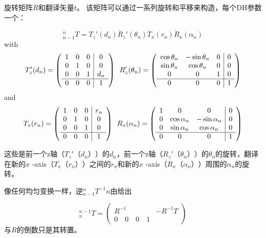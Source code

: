 旋转矩阵$ R $和翻译矢量$ t $。 该矩阵可以通过一系列旋转和平移来构造，每个DH参数一个：

\begin{equation}
_{n-1}^nT=T_z'(d_n)\dot R_z'(\theta_n) \dot T_x(r_n) \dot R_x(\alpha_n)
\end{equation}
with
\begin{equation}
T_z'(d_n)=
\left(
\begin{array}{ccc|c}
1 & 0 & 0 & 0\\
0 & 1 & 0 & 0\\
0 & 0 & 1 & d_n\\
\hline
0 & 0 & 0 & 1
\end{array}
\right)
\enskip
R_z'(\theta_n)=\left(
\begin{array}{ccc|c}
\cos\theta_n & -\sin\theta_n & 0 & 0\\
\sin\theta_n & \cos\theta_n & 0 & 0\\
0 & 0 & 1 & 0\\
\hline
0 & 0 & 0 & 1
\end{array}
\right)
\end{equation}
and
\begin{equation}
T_x(r_n)=
\left(
\begin{array}{ccc|c}
1 & 0 & 0 & r_n\\
0 & 1 & 0 & 0\\
0 & 0 & 1 & 0\\
\hline
0 & 0 & 0 & 1
\end{array}
\right)
\enskip
R_x(\alpha_n)=\left(
\begin{array}{ccc|c}
1 & 0 & 0 & 0\\
0 & \cos\alpha_n & -\sin\alpha_n & 0\\
0 & \sin\alpha_n & \cos\alpha_n & 0\\
\hline
0 & 0 & 0 & 1
\end{array}
\right)
\end{equation} 

这些是前一个z轴（$ T_z'（d_n）$）的$ d_n $，前一个z轴（$ R_z'（\theta_n）$）的$ \theta_n $的旋转，翻译 在新的$ x $ -axis（$ T_x（r_n）$）之间的$ r_n $和新的$ x $ -axis（$ R_x（\alpha_n）$）周围的$ \alpha_n $的旋转。


像任何均匀变换一样，逆$ _ {n-1} ^ nT ^ { - 1} n $由给出

\begin{equation}
^{n-1}_nT=\left(
\begin{array}{c|c}
R^{-1} & -R^{-1}T\\
\hline
0 \quad 0 \quad 0 \quad 1
\end{array}
\right)
\end{equation}
与$ R $的倒数只是其转置。
